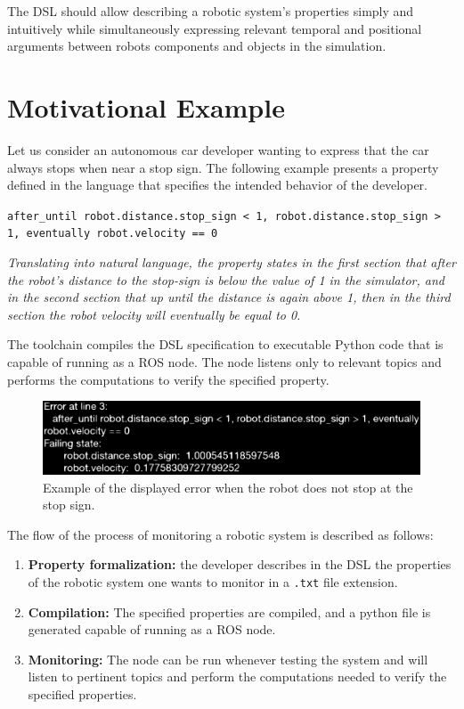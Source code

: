 The DSL should allow describing a robotic system's properties simply and intuitively while simultaneously expressing relevant temporal and positional arguments between robots components and objects in the simulation.


\section{Motivational Example}
\label{sec:motivationalexample}

Let us consider an autonomous car developer wanting to express that the car always stops when near a stop sign. The following example presents a property defined in the language that specifies the intended behavior of the developer.

\texttt{after\_until robot.distance.stop\_sign < 1, robot.distance.stop\_sign > 1, eventually robot.velocity == 0}

\textit{Translating into natural language, the property states in the first section that after the robot's distance to the stop-sign is below the value of 1 in the simulator, and in the second section that up until the distance is again above 1, then in the third section the robot velocity will eventually be equal to 0.}

The toolchain compiles the DSL specification to executable Python code that is capable of running as a ROS node. The node listens only to relevant topics and performs the computations to verify the specified property.

\begin{figure}
\includegraphics[width=\textwidth]{images/error.eps}
\caption{Example of the displayed error when the robot does not stop at the stop sign.} \label{fig:error}
\end{figure}

The flow of the process of monitoring a robotic system is described as follows:

\begin{enumerate}[label=(\roman*)]
    \item \textbf{Property formalization:} the developer describes in the DSL the properties of the robotic system one wants to monitor in a \texttt{.txt} file extension.
    \item \textbf{Compilation:} The specified properties are compiled, and a python file is generated capable of running as a ROS node.
    \item \textbf{Monitoring:} The node can be run whenever testing the system and will listen to pertinent topics and perform the computations needed to verify the specified properties.
\end{enumerate}


